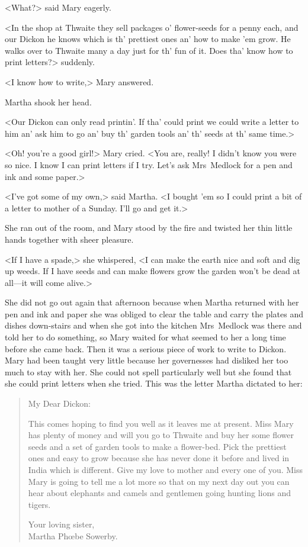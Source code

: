 <What?> said Mary eagerly.

<In the shop at Thwaite they sell packages o' flower-seeds for a penny each, and our Dickon he knows which is th' prettiest ones an' how to make 'em grow. He walks over to Thwaite many a day just for th' fun of it. Does tha' know how to print letters?> suddenly.

<I know how to write,> Mary answered.

Martha shook her head.

<Our Dickon can only read printin'. If tha' could print we could write a letter to him an' ask him to go an' buy th' garden tools an' th' seeds at th' same time.>

<Oh! you're a good girl!> Mary cried. <You are, really! I didn't know you were so nice. I know I can print letters if I try. Let's ask Mrs~Medlock for a pen and ink and some paper.>

<I've got some of my own,> said Martha. <I bought 'em so I could print a bit of a letter to mother of a Sunday. I'll go and get it.>

She ran out of the room, and Mary stood by the fire and twisted her thin little hands together with sheer pleasure.

<If I have a spade,> she whispered, <I can make the earth nice and soft and dig up weeds. If I have seeds and can make flowers grow the garden won't be dead at all—it will come alive.>

She did not go out again that afternoon because when Martha returned with her pen and ink and paper she was obliged to clear the table and carry the plates and dishes down-stairs and when she got into the kitchen Mrs~Medlock was there and told her to do something, so Mary waited for what seemed to her a long time before she came back. Then it was a serious piece of work to write to Dickon. Mary had been taught very little because her governesses had disliked her too much to stay with her. She could not spell particularly well but she found that she could print letters when she tried. This was the letter Martha dictated to her:

\begin{quotation}
\noindent My Dear Dickon:

This comes hoping to find you well as it leaves me at present. Miss Mary has plenty of money and will you go to Thwaite and buy her some flower seeds and a set of garden tools to make a flower-bed. Pick the prettiest ones and easy to grow because she has never done it before and lived in India which is different. Give my love to mother and every one of you. Miss Mary is going to tell me a lot more so that on my next day out you can hear about elephants and camels and gentlemen going hunting lions and tigers.

\begin{flushright}
Your loving sister,\\
Martha Phœbe Sowerby.
\end{flushright}
\end{quotation}


